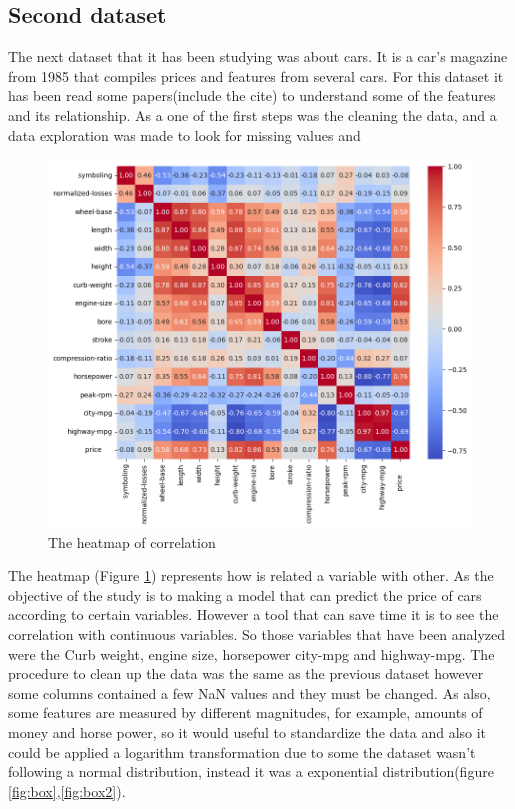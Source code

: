 \documentclass{article}
\begin{document}
\subsection{Second dataset}
The next dataset that it has been studying was about cars. It is a car's magazine from 1985 that compiles prices and features from several cars. 
For this dataset it has been read some papers(include the cite) to understand some of the features and its relationship. 
As a one of the first steps was the cleaning the data, and a data exploration was made to look for missing values and 
\begin{center}
\begin{figure}[H]
  \includegraphics[width=1\textwidth]{heatmap.png}
  \caption{The heatmap of correlation}
  \label{fig:heatmap}
\end{figure}
\end{center}
The heatmap (Figure \ref{fig:heatmap}) represents how is related a variable with other. As the objective of the study is to making a model that can predict the price of cars according to certain variables. 
However a tool that can save time it is to see the correlation with continuous variables. So those variables that have been analyzed were the Curb weight, engine size, horsepower city-mpg and highway-mpg.
The procedure to clean up the data was the same as the previous dataset however some columns contained a few NaN values and they must be changed. As also, some features are measured by different magnitudes, for example, amounts of money and horse power, so it would useful to standardize the data and also it could be applied a logarithm transformation due to some the dataset wasn't following a normal distribution, instead it was a exponential distribution(figure \ref{fig:box},\ref{fig:box2}).
\end{document}
